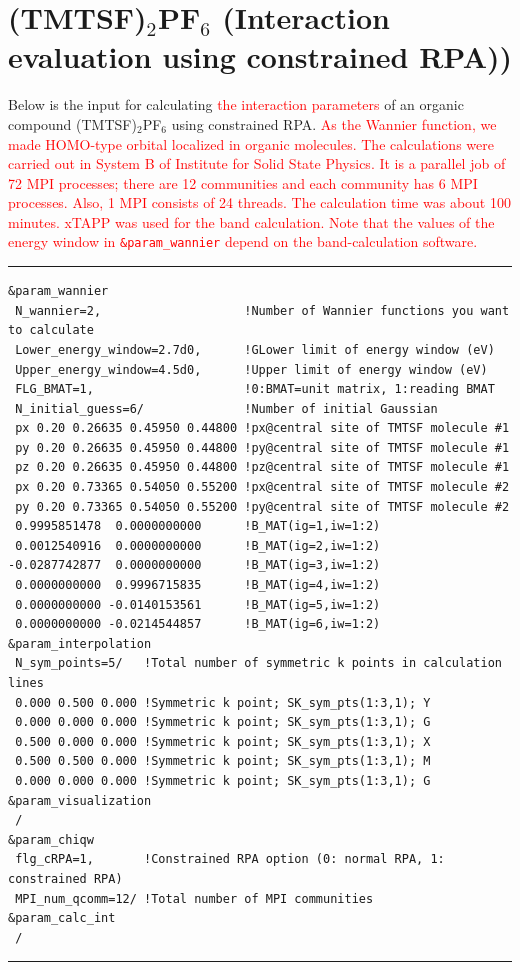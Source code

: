 \documentclass{article}
\newcommand{\tr}[1]{\textcolor{red}{#1}}
\begin{document}
\clearpage 

\section{\label{TMTSF}(TMTSF)$_2$PF$_6$ (Interaction evaluation using constrained RPA))} 
Below is the input for calculating \tr{the interaction parameters} of an organic compound (TMTSF)$_2$PF$_6$ using constrained RPA. \tr{As the Wannier function, we made HOMO-type orbital localized in organic molecules. The calculations were carried out in System B of Institute for Solid State Physics. It is a parallel job of 72 MPI processes; there are 12 communities and each community has 6 MPI processes. Also, 1 MPI consists of 24 threads. The calculation time was about 100 minutes. {\sc xTAPP} was used for the band calculation. Note that the values of the energy window in {\tt \&param\_wannier} depend on the band-calculation software.}
\vspace{3mm}\hrule
\begin{verbatim}
&param_wannier 
 N_wannier=2,                    !Number of Wannier functions you want to calculate
 Lower_energy_window=2.7d0,      !GLower limit of energy window (eV)
 Upper_energy_window=4.5d0,      !Upper limit of energy window (eV)
 FLG_BMAT=1,                     !0:BMAT=unit matrix, 1:reading BMAT    
 N_initial_guess=6/              !Number of initial Gaussian
 px 0.20 0.26635 0.45950 0.44800 !px@central site of TMTSF molecule #1
 py 0.20 0.26635 0.45950 0.44800 !py@central site of TMTSF molecule #1
 pz 0.20 0.26635 0.45950 0.44800 !pz@central site of TMTSF molecule #1
 px 0.20 0.73365 0.54050 0.55200 !px@central site of TMTSF molecule #2
 py 0.20 0.73365 0.54050 0.55200 !py@central site of TMTSF molecule #2
 0.9995851478  0.0000000000      !B_MAT(ig=1,iw=1:2)
 0.0012540916  0.0000000000      !B_MAT(ig=2,iw=1:2)
-0.0287742877  0.0000000000      !B_MAT(ig=3,iw=1:2)
 0.0000000000  0.9996715835      !B_MAT(ig=4,iw=1:2)
 0.0000000000 -0.0140153561      !B_MAT(ig=5,iw=1:2)
 0.0000000000 -0.0214544857      !B_MAT(ig=6,iw=1:2)
&param_interpolation   
 N_sym_points=5/   !Total number of symmetric k points in calculation lines
 0.000 0.500 0.000 !Symmetric k point; SK_sym_pts(1:3,1); Y
 0.000 0.000 0.000 !Symmetric k point; SK_sym_pts(1:3,1); G
 0.500 0.000 0.000 !Symmetric k point; SK_sym_pts(1:3,1); X
 0.500 0.500 0.000 !Symmetric k point; SK_sym_pts(1:3,1); M 
 0.000 0.000 0.000 !Symmetric k point; SK_sym_pts(1:3,1); G
&param_visualization   
 /
&param_chiqw 
 flg_cRPA=1,       !Constrained RPA option (0: normal RPA, 1: constrained RPA)
 MPI_num_qcomm=12/ !Total number of MPI communities
&param_calc_int 
 /
\end{verbatim}\hrule
\end{document}
